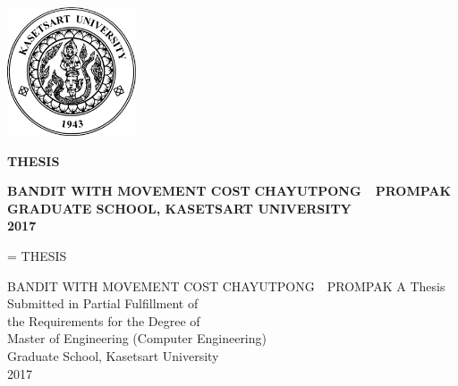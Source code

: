 \thispagestyle{empty}
\setlength{\headsep}{0in}
\begin{titlepage}
\centering
\parskip=0pt
\renewcommand{\baselinestretch}{0}
\fontsize{14pt}{0}
\includegraphics[width=1.5in]{kulogo}
\vspace{0.25in}

{\fontsize{0.25in}{0} \textbf{THESIS} }
\vspace{0.38in}

\textbf{BANDIT WITH MOVEMENT COST}
\vfill
\textbf{CHAYUTPONG\ \ PROMPAK}
\vfill
\textbf{GRADUATE SCHOOL, KASETSART UNIVERSITY\\2017}
\vspace{0.2in}
\end{titlepage}
\setlength{\headsep}{0.4in}

%

\begin{titlepage}
\centering
\parskip=\baselineskip
\renewcommand{\baselinestretch}{0}
\fontsize{12pt}{0}
{\fontsize{14pt}{0}\selectfont THESIS}


{\fontsize{14pt}{0}\selectfont BANDIT WITH MOVEMENT COST}
\vfill
CHAYUTPONG\ \ PROMPAK
\vfill
A Thesis Submitted in Partial Fulfillment of \\
the Requirements for the Degree of \\
Master of Engineering (Computer Engineering) \\ 
Graduate School, Kasetsart University \\
2017
\end{titlepage}
